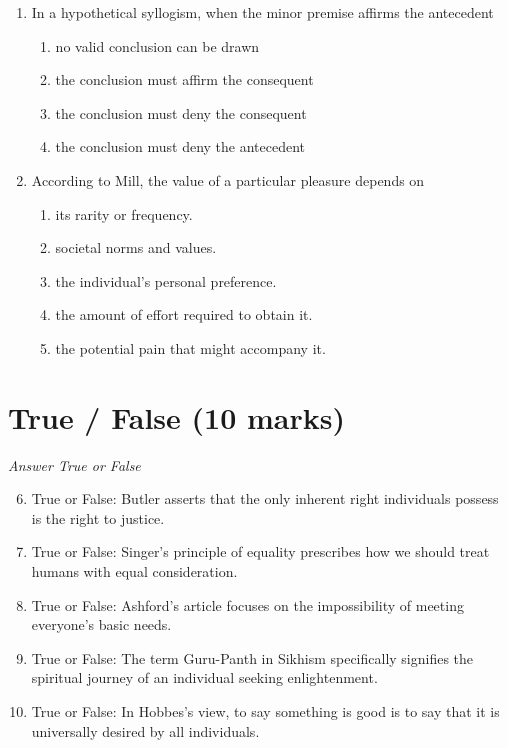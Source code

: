 \documentclass[12pt]{article}
\begin{document}
\begin{enumerate}[label=\arabic*.]
\begin{enumerate}[label=(\alph*)]
\end{enumerate}
\item In a hypothetical syllogism, when the minor premise affirms the antecedent
\begin{enumerate}[label=(\alph*)]
    \item no valid conclusion can be drawn
    \item the conclusion must affirm the consequent
    \item the conclusion must deny the consequent
    \item the conclusion must deny the antecedent
\end{enumerate}
\item According to Mill, the value of a particular pleasure depends on
\begin{enumerate}[label=(\alph*)]
    \item its rarity or frequency.
    \item societal norms and values.
    \item the individual's personal preference.
    \item the amount of effort required to obtain it.
    \item the potential pain that might accompany it.
\end{enumerate}
\end{enumerate}

\section*{True / False (10 marks)}
\textit{Answer True or False}
\begin{enumerate}[label=\arabic*.]
\setcounter{enumi}{5}
\item True or False: Butler asserts that the only inherent right individuals possess is the right to justice.
\item True or False: Singer's principle of equality prescribes how we should treat humans with equal consideration.
\item True or False: Ashford's article focuses on the impossibility of meeting everyone's basic needs.
\item True or False: The term Guru-Panth in Sikhism specifically signifies the spiritual journey of an individual seeking enlightenment.
\item True or False: In Hobbes's view, to say something is good is to say that it is universally desired by all individuals.
\end{enumerate}
\end{document}
